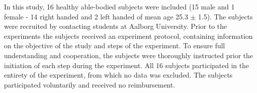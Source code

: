 In this study, 16 healthy able-bodied subjects were included (15 male and 1 female - 14 right handed and 2 left handed of mean age 25.3 $\pm$ 1.5). The subjects were recruited by contacting students at Aalborg University. Prior to the experiments the subjects received an experiment protocol, containing information on the objective of the study and steps of the experiment. To ensure full understanding and cooperation, the subjects were thoroughly instructed prior the initiation of each step during the experiment. All 16 subjects participated in the entirety of the experiment, from which no data was excluded. The subjects participated voluntarily and received no reimbursement.